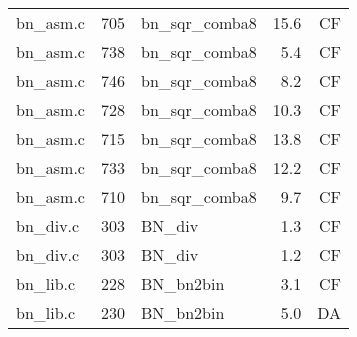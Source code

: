 \begin{table}[h!]
\begin{tabular}{lrlrr}
bn\_asm.c& 705&bn\_sqr\_comba8&15.6 &CF\\
bn\_asm.c& 738&bn\_sqr\_comba8&5.4 &CF\\
bn\_asm.c& 746&bn\_sqr\_comba8&8.2 &CF\\
bn\_asm.c& 728&bn\_sqr\_comba8&10.3 &CF\\
bn\_asm.c& 715&bn\_sqr\_comba8&13.8 &CF\\
bn\_asm.c& 733&bn\_sqr\_comba8&12.2 &CF\\
bn\_asm.c& 710&bn\_sqr\_comba8&9.7 &CF\\
bn\_div.c& 303&BN\_div&1.3 &CF\\
bn\_div.c& 303&BN\_div&1.2 &CF\\
bn\_lib.c& 228&BN\_bn2bin&3.1 &CF\\
bn\_lib.c& 230&BN\_bn2bin&5.0 &DA\\
\hline
\end{tabular}
\renewcommand{\baselinestretch}{1.0}\selectfont
\end{table}
